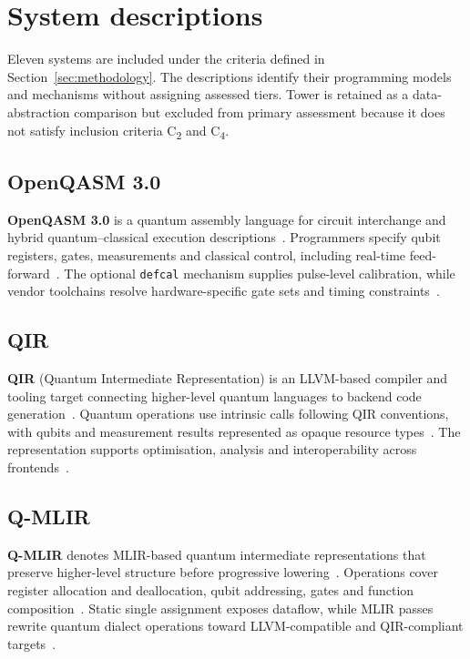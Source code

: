 \section{System descriptions}\label{sec:system_descriptions}
Eleven systems are included under the criteria defined in Section~\ref{sec:methodology}.
The descriptions identify their programming models and mechanisms without assigning assessed tiers.
Tower is retained as a data-abstraction comparison but excluded from primary assessment because it does not satisfy inclusion criteria C\textsubscript{2} and C\textsubscript{4}.

\subsection{OpenQASM 3.0}\label{subsec:system_descriptions:openqasm}
\textbf{OpenQASM 3.0} is a quantum assembly language for circuit interchange and hybrid quantum--classical execution descriptions~\cite{cross2022openqasm3}.
Programmers specify qubit registers, gates, measurements and classical control, including real-time feed-forward~\cite{cross2022openqasm3}.
The optional \texttt{defcal} mechanism supplies pulse-level calibration, while vendor toolchains resolve hardware-specific gate sets and timing constraints~\cite{cross2022openqasm3}.

\subsection{QIR}\label{subsec:system_descriptions:qir}
\textbf{QIR} (Quantum Intermediate Representation) is an LLVM-based compiler and tooling target connecting higher-level quantum languages to backend code generation~\cite{qir_alliance_qir_spec_repo,microsoft_qir_overview}.
Quantum operations use intrinsic calls following QIR conventions, with qubits and measurement results represented as opaque resource types~\cite{qir_alliance_qir_spec_repo}.
The representation supports optimisation, analysis and interoperability across frontends~\cite{qir_alliance_qir_spec_repo,microsoft_qir_overview}.

\subsection{Q-MLIR}\label{subsec:system_descriptions:qmlir}
\textbf{Q-MLIR} denotes MLIR-based quantum intermediate representations that preserve higher-level structure before progressive lowering~\cite{McCaskey2021MLIRDialectQASM}.
Operations cover register allocation and deallocation, qubit addressing, gates and function composition~\cite{McCaskey2021MLIRDialectQASM}.
Static single assignment exposes dataflow, while MLIR passes rewrite quantum dialect operations toward LLVM-compatible and QIR-compliant targets~\cite{McCaskey2021MLIRDialectQASM}.

